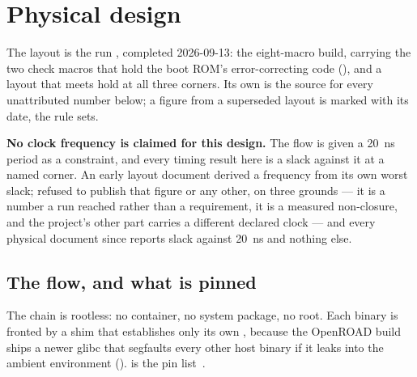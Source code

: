 
\chapter{Physical design}
\label{ch:phys}

The layout is the run , completed 2026-09-13: the
eight-macro build, carrying the two check macros that hold the boot
ROM's error-correcting code (), and a layout that
meets hold at all three corners. Its own
 is the source for every unattributed number
below; a figure from a superseded layout is marked with its date, the
rule  sets.

\textbf{No clock frequency is claimed for this design.} The flow is
given a \qty{20}{\nano\second} period as a constraint, and every timing
result here is a slack against it at a named corner. An early layout
document derived a frequency from its own worst slack;
 refused to publish that figure or any other, on
three grounds --- it is a number a run reached rather than a
requirement, it is a measured non-closure, and the project's other part
carries a different declared clock --- and every physical document since
reports slack against \qty{20}{\nano\second} and nothing else.

\section{The flow, and what is pinned}

The chain is rootless: no container, no system package, no root. Each
binary is fronted by a shim that establishes only its own
, because the OpenROAD build ships a newer glibc
that segfaults every other host binary if it leaks into the ambient
environment ().  is the pin
list~\cite{lamb2022}.

